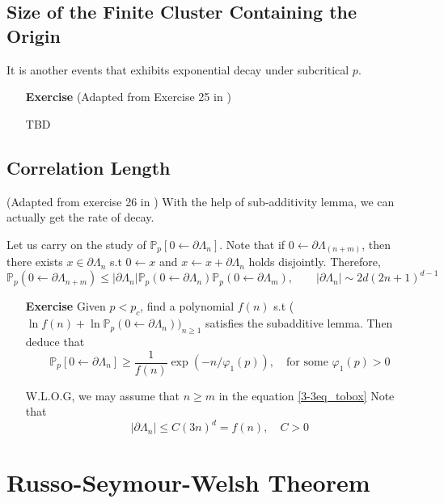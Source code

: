 \documentclass[12pt,a4paper]{report}
\theoremstyle{definition}
\newcommand{\SOL}{\fbox{ \tt s\parbox[b][2pt][c]{6pt}{o}\hspace*{-7pt} L:}}
\begin{document}
\section{Size of the Finite Cluster Containing the Origin}
It is another events that exhibits exponential decay under subcritical $p$. 
\begin{enumerate}
	\item[\textbf{Exercise}](Adapted from Exercise 25 in \cite{Copin18})
	\item[\SOL] TBD 
\end{enumerate}
\section{Correlation Length}
(Adapted from exercise 26 in \cite{Copin18})
With the help of sub-additivity lemma, we can actually get the rate of decay.

Let us carry on the study of $\mathbb{P}_p[0 \longleftarrow \partial \Lambda_n]$.
Note that if $0 \longleftarrow \partial \Lambda_(n+m)$, then there exists $x \in \partial \Lambda_n$ s.t $0 \longleftarrow x$ and $x \longleftarrow x + \partial \Lambda_n$ holds disjointly.
Therefore,
\begin{equation}\label{3-3eq_tobox}
	\mathbb{P}_p(0 \longleftarrow \partial \Lambda_{n+m}) \leq |\partial \Lambda_n| \mathbb{P}_p(0 \longleftarrow \partial \Lambda_n)\mathbb{P}_p(0 \longleftarrow \partial \Lambda_m),  \qquad |\partial \Lambda_n| \sim 2d(2n+1)^{d-1}
\end{equation}

\begin{enumerate}
	\item[\textbf{Exercise}] Given $p < p_c$, find a polynomial $f(n)$ s.t ( $\ln{f(n)} + \ln{\mathbb{P}_p(0 \longleftarrow \partial \Lambda_n)})_{n \geq 1}$ 
	satisfies the subadditive lemma. Then deduce that
	$$
	\mathbb{P}_p[0 \longleftarrow \partial\Lambda_n] \geq \frac{1}{f(n)}\exp{(-n/\varphi_1(p))}, \quad \text{for some $\varphi_1(p) > 0$} 
	$$  
	\item[\SOL] W.L.O.G, we may assume that $n \geq m $ in the equation \ref{3-3eq_tobox} 
	Note that 
	\begin{equation}
		|\partial \Lambda_n| \leq C(3n)^{d} = f(n),\quad C > 0
	\end{equation}
\end{enumerate}


\chapter{Russo-Seymour-Welsh Theorem}
\printbibliography
\end{document}
